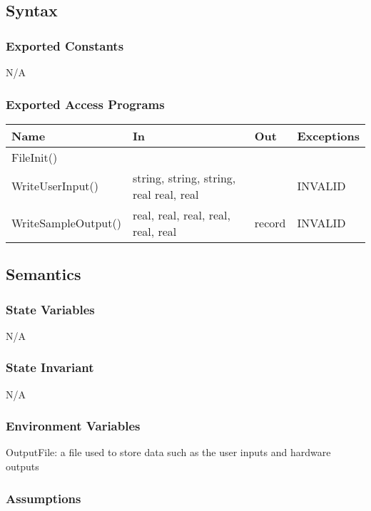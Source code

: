 \documentclass[12pt, titlepage]{article}
\begin{document}
\subsection{Syntax}

\subsubsection{Exported Constants}

N/A

\subsubsection{Exported Access Programs}

\begin{center}
\begin{tabular}{p{4cm} p{6cm} p{2cm} p{3cm}}
\hline
\textbf{Name} & \textbf{In} & \textbf{Out} & \textbf{Exceptions} \\
\hline
FileInit() & &  &  \\
WriteUserInput() & string, string, string, real real, real&  & INVALID \\
WriteSampleOutput()& real, real, real, real, real, real & record & INVALID \\

\hline
\end{tabular}
\end{center}

\subsection{Semantics}

\subsubsection{State Variables}

N/A
\subsubsection{State Invariant}

N/A
\subsubsection{Environment Variables}

OutputFile: a file used to store data such as the user inputs and hardware outputs

\subsubsection{Assumptions}
\end{document}
